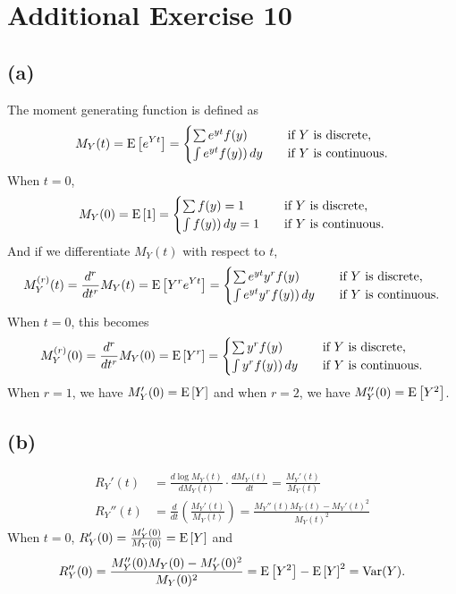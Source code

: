 \section*{Additional Exercise 10}
\subsection*{(a)}
The moment generating function is defined as
\begin{align*}
M_{Y}(t) = \mathrm{E}\left[e^{Yt}\right] = 
\begin{cases}
\sum e^{yt} f(y) & \quad \mbox{if $Y$ is discrete,}\\
\int e^{yt} f(y) )\,dy & \quad \mbox{if $Y$ is continuous.}
\end{cases}
\end{align*}
When $t = 0$,
\begin{align*}
M_{Y}(0) = \mathrm{E}\left[1\right] = 
\begin{cases}
\sum f(y) = 1 & \quad \mbox{if $Y$ is discrete,}\\
\int f(y) )\, dy =1 & \quad \mbox{if $Y$ is continuous.}
\end{cases}
\end{align*}
And if we differentiate $M_{Y}(t)$ with respect to $t$,
\begin{align*}
M_{Y}^{(r)}(t) = \frac{d^{r}}{d t^{r}}M_{Y}(t) = \mathrm{E}\left[Y^{r}e^{Yt}\right] = 
\begin{cases}
\sum e^{yt} y^{r} f(y) & \quad \mbox{if $Y$ is discrete,}\\
\int e^{yt} y^{r} f(y) )\,dy & \quad \mbox{if $Y$ is continuous.}
\end{cases}
\end{align*}
When $t = 0$, this becomes
\begin{align*}
M_{Y}^{(r)}(0) = \frac{d^{r}}{d t^{r}}M_{Y}(0) = \mathrm{E}\left[Y^{r}\right] = 
\begin{cases}
\sum y^{r} f(y) & \quad \mbox{if $Y$ is discrete,}\\
\int y^{r} f(y) )\,dy & \quad \mbox{if $Y$ is continuous.}
\end{cases}
\end{align*}
When $r = 1$, we have $M_{Y}'(0) = \mathrm{E}\left[Y\right]$ and when  $r = 2$, we have $M_{Y}''(0) = \mathrm{E}\left[Y^{2}\right]$.

\subsection*{(b)}
\begin{align*}
R_{Y}'(t) &= \frac{d \log M_{Y}(t)}{d M_{Y}(t)} \cdot \frac{d M_{Y}(t)}{d t} = \frac{M_{Y}'(t)}{M_{Y}(t)}\\
R_{Y}''(t) &= \frac{d}{d t} \left(\frac{M_{Y}'(t)}{M_{Y}(t)} \right) = \frac{M_{Y}''(t) M_{Y}(t) - M_{Y}'(t)^2}{M_{Y}(t)^2}
\end{align*}
When $t = 0$, $R_{Y}'(0) = \frac{M_{Y}'(0)}{M_{Y}(0)} = \mathrm{E}\left[Y\right]$ and $$R_{Y}''(0) = \frac{M_{Y}''(0) M_{Y}(0) - M_{Y}'(0)^2}{M_{Y}(0)^2} = \mathrm{E}\left[Y^{2}\right] - \mathrm{E}\left[Y\right]^{2} = \mathrm{Var}(Y).$$
